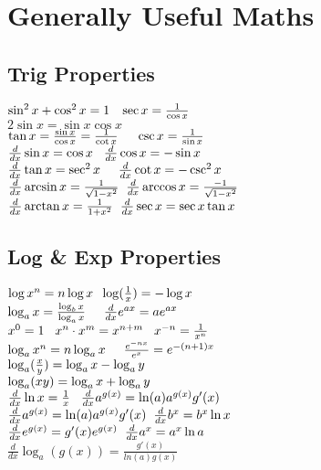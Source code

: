 \section{Generally Useful Maths}
\subsection*{Trig Properties}
$\sin^2x + \cos^2x = 1 \hspace{3mm} \sec x = \frac{1}{\cos x}$\\
$2 \sin x = \sin x \cos x$\\
$\tan x = \frac{\sin x}{\cos x} = \frac{1}{\cot x} \hspace{5mm} \csc x = \frac{1}{\sin x}$\\
$\frac{d}{dx}\sin x= \cos x \hspace{3mm} \frac{d}{dx}\cos x= - \sin x$\\
$\frac{d}{dx}\tan x = \sec^2 x \hspace{5mm} \frac{d}{dx}\cot x = - \csc^2 x$\\
$\frac{d}{dx} \arcsin x = \frac{1}{\sqrt{1 - x^2}}  \hspace{2mm}   \frac{d}{dx} \arccos x = \frac{-1}{\sqrt{1 - x^2}}  $\\
$\frac{d}{dx} \arctan x = \frac{1}{1 + x^2} \hspace{2mm} \frac{d}{dx} \sec x = \sec x \tan x $\\

\subsection*{Log \& Exp Properties}
$ \log x^n = n \log x \hspace{2mm} \log(\frac{1}{x}) = - \log x$\\
$\log_ax = \frac{\log_bx}{\log_ax} \hspace{5mm} \frac{d}{dx}e^{ax} = ae^{ax}$\\
$x^0 = 1 \hspace{3mm} x^n \cdot x^m = x^{n+m} \hspace{3mm} x^{-n} = \frac{1}{x^n}    $\\
$\log_a x^n = n \log_a x \hspace{5mm} \frac{e^{-n x}}{e^x} = e^{-(n+1)x}    $\\
$\log_a (\frac{x}{y}) = \log_a x - \log_a y \hspace{2mm}  $\\
$\log_a (xy) = \log_a x + \log_a y \hspace{2mm}  $\\
$\frac{d}{dx} \ln x = \frac{1}{x} \hspace{3mm} \frac{d}{dx} a^{g(x)} = \ln (a) a^{g(x)} g'(x)$\\
$\frac{d}{dx} a^{g(x)} = \ln (a) a^{g(x)} g'(x) \hspace{2mm} \frac{d}{dx} b^x = b^x \ln x  $\\
$\frac{d}{dx} e^{g(x)} = g'(x)e^{g(x)} \hspace{2mm} \frac{d}{dx}a^{x} = a^{x} \ln a$\\
$\frac{d}{dx} \log_a(g(x)) = \frac{g'(x)}{ln(a)g(x)}$\\

